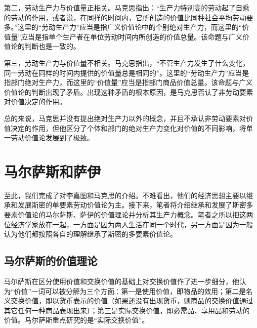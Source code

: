 第二，劳动生产力与价值量正相关。马克思指出：“生产力特别高的劳动起了自乘的劳动的作用，或者说，在同样的时间内，它所创造的价值比同种社会平均劳动要多。”\cite[370]{ZhongGongZhongYangMaKeSiEnGeSiLieNingSiDaLinZhuZuoBianYiJuMaKeSiEnGeSiWenJiDi5Juan2009}这里的“劳动生产力”应当是指广义价值论中的个别绝对生产力，而这里的“价值量”应当是指单个生产者在单位劳动时间内所创造的价值总量\cite[273]{CaiJiMingCongGuDianZhengZhiJingJiXueDaoZhongGuoTeSeSheHuiZhuYiZhengZhiJingJiXueJiYuZhongGuoShiJiaoDeZhengZhiJingJiXueYanBianShangCe2023}。该命题与广义价值论的判断也是一致的。

第三，劳动生产力与价值量不相关。马克思指出，“不管生产力发生了什么变化，同一劳动在同样的时间内提供的价值量总是相同的”\cite[60]{ZhongGongZhongYangMaKeSiEnGeSiLieNingSiDaLinZhuZuoBianYiJuMaKeSiEnGeSiWenJiDi5Juan2009}。这里的“劳动生产力”应当是指部门绝对生产力，而这里的“价值量”应当是指部门商品价值总量\cite[274]{CaiJiMingCongGuDianZhengZhiJingJiXueDaoZhongGuoTeSeSheHuiZhuYiZhengZhiJingJiXueJiYuZhongGuoShiJiaoDeZhengZhiJingJiXueYanBianShangCe2023}。该命题与广义价值论的判断出现了矛盾。出现这种矛盾的根本原因，是马克思否认了非劳动要素对价值决定的作用\cite[274]{CaiJiMingCongGuDianZhengZhiJingJiXueDaoZhongGuoTeSeSheHuiZhuYiZhengZhiJingJiXueJiYuZhongGuoShiJiaoDeZhengZhiJingJiXueYanBianShangCe2023}。

总的来说，马克思并没有提出绝对生产力以外的概念，并且不承认非劳动要素对价值决定的作用，但他区分了个体和部门的绝对生产力变化对价值的不同影响，将单一劳动价值论发展到了极致。

\section{马尔萨斯和萨伊}

至此，我们完成了对李嘉图和马克思的介绍。不难看出，他们的经济思想主要以继承和发展斯密的单要素劳动价值论为主。接下来，笔者将介绍继承和发展了斯密多要素价值论的马尔萨斯、萨伊的价值理论并分析其生产力概念。笔者之所以把这两位经济学家放在一起，一方面是因为两人生活在同一个时代\cite[132，140]{YanZhiJieXiFangJingJiXueShuoShiJiaoChengDiErBan2013}，另一方面是因为一般认为他们都按照各自的理解继承了斯密的多要素价值论\cite[169]{CaiJiMingCongGuDianZhengZhiJingJiXueDaoZhongGuoTeSeSheHuiZhuYiZhengZhiJingJiXueJiYuZhongGuoShiJiaoDeZhengZhiJingJiXueYanBianShangCe2023}。

\subsection{马尔萨斯的价值理论}

马尔萨斯在区分使用价值和交换价值的基础上对交换价值作了进一步细分，他认为“价值”一词可以被分解为三个方面：第一是使用价值，即物品的效用；第二是名义交换价值，即以货币表示的价值（如果还没有出现货币，则商品的交换价值通过其它任何一种商品表现出来\cite[32]{BiLuo*SiLaFaDaWeiLiJiaTuQuanJiDi2JuanMaErSaSiZhengZhiJingJiXueYuanLiPingZhu2013}）；第三是实际交换价值，即必需品、享用品和劳动的价值\cite[42]{BiLuo*SiLaFaDaWeiLiJiaTuQuanJiDi2JuanMaErSaSiZhengZhiJingJiXueYuanLiPingZhu2013}。马尔萨斯重点研究的是“实际交换价值”。

